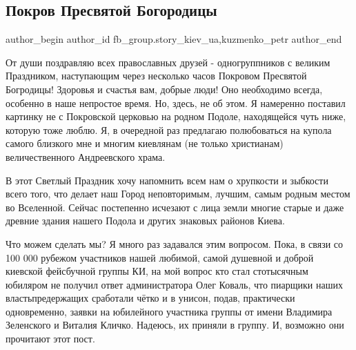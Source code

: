  
 
 
 
 
 
\subsection{Покров Пресвятой Богородицы}
\label{sec:13_10_2021.fb.fb_group.story_kiev_ua.3.pokrov}
 
\ifcmt
 author_begin
   author_id fb_group.story_kiev_ua,kuzmenko_petr
 author_end
\fi

От души поздравляю всех православных друзей - одногруппников с великим
Праздником, наступающим через несколько часов Покровом Пресвятой Богродицы!
Здоровья и счастья вам, добрые люди! Оно необходимо всегда, особенно в наше
непростое время. Но, здесь, не об этом. Я намеренно поставил картинку не с
Покровской церковью на родном Подоле, находящейся чуть ниже, которую тоже
люблю. Я, в очередной раз предлагаю полюбоваться на купола самого близкого мне
и многим киевлянам (не только христианам) величественного Андреевского храма. 

В этот Светлый Праздник хочу напомнить всем нам о хрупкости и зыбкости всего
того, что делает наш Город неповторимым, лучшим, самым родным местом во
Вселенной. Сейчас постепенно исчезают с лица земли многие старые и даже древние
здания нашего Подола и других знаковых районов Киева. 

Что можем сделать мы? Я много раз задавался этим вопросом. Пока, в связи со 100
000 рубежом участников нашей любимой, самой душевной и доброй киевской
фейсбучной группы КИ, на мой вопрос кто стал стотысячным юбиляром не получил
ответ администратора Олег Коваль, что пиарщики наших властьпредержащих
сработали чётко и в унисон, подав, практически одновременно, заявки на
юбилейного участника группы от имени Владимира Зеленского и Виталия Кличко.
Надеюсь, их приняли в группу. И, возможно они прочитают этот пост. 

